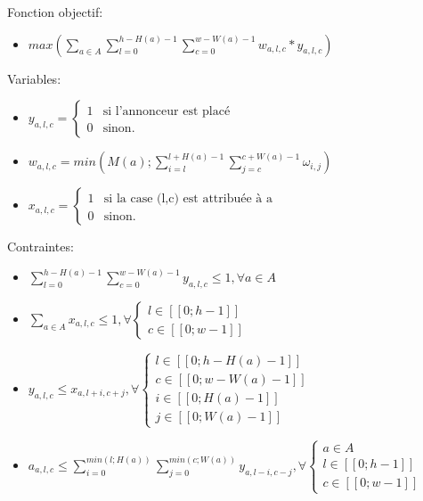 \documentclass{article}
\begin{document}
Fonction objectif:
\begin{itemize}
    \item $max(\sum_{a \in A} \sum_{l=0}^{h-H(a)-1} \sum_{c=0}^{w-W(a)-1} w_{a,l,c}*y_{a,l,c})$
\end{itemize}
Variables:
\begin{itemize}
    \item $y_{a,l,c} = \left\{
              \begin{array}{ll}
                  1 & \mbox{si } \text{l'annonceur est placé} \\
                  0 & \mbox{sinon.}
              \end{array}
              \right.$
    \item $w_{a,l,c} = min(M(a); \sum_{i=l}^{l+H(a)-1} \sum_{j=c}^{c+W(a)-1} \omega_{i,j})$
    \item $x_{a,l,c} = \left\{
              \begin{array}{ll}
                  1 & \mbox{si } \text{la case (l,c) est attribuée à a} \\
                  0 & \mbox{sinon.}
              \end{array}
              \right.$
\end{itemize}
Contraintes:
\begin{itemize}
    \item $\sum_{l=0}^{h-H(a)-1} \sum_{c=0}^{w-W(a)-1} y_{a,l,c} \leq 1, \forall a \in A$
    \item $\sum_{a \in A} x_{a,l,c} \leq 1, \forall \left\{
              \begin{array}{ll}
                  l \in [\![0;h-1]\!] \\
                  c \in [\![0;w-1]\!]
              \end{array}
              \right.$
    \item $y_{a,l,c} \leq x_{a,l+i,c+j}, \forall \left\{
              \begin{array}{ll}
                  l \in [\![0;h-H(a)-1]\!] \\
                  c \in [\![0;w-W(a)-1]\!] \\
                  i \in [\![0; H(a)-1]\!] \\
                  j \in [\![0; W(a)-1]\!]
              \end{array}
              \right.$
    \item $a_{a,l,c} \leq \sum_{i=0}^{min(l;H(a))} \sum_{j=0}^{min(c;W(a))} y_{a,l-i,c-j}, \forall \left\{
        \begin{array}{ll}
            a \in A \\
            l \in [\![0; h-1]\!] \\
            c \in [\![0; w-1]\!]
        \end{array}
        \right.$
\end{itemize}
\end{document}
